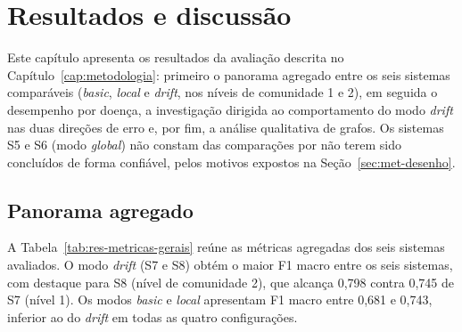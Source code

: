 \chapter{Resultados e discussão}\label{cap:resultados}

Este capítulo apresenta os resultados da avaliação descrita no Capítulo~\ref{cap:metodologia}: primeiro o panorama agregado entre os seis sistemas comparáveis (\textit{basic}, \textit{local} e \textit{drift}, nos níveis de comunidade 1 e 2), em seguida o desempenho por doença, a investigação dirigida ao comportamento do modo \textit{drift} nas duas direções de erro e, por fim, a análise qualitativa de grafos. Os sistemas S5 e S6 (modo \textit{global}) não constam das comparações por não terem sido concluídos de forma confiável, pelos motivos expostos na Seção~\ref{sec:met-desenho}.

\section{Panorama agregado}\label{sec:res-panorama}

A Tabela~\ref{tab:res-metricas-gerais} reúne as métricas agregadas dos seis sistemas avaliados. O modo \textit{drift} (S7 e S8) obtém o maior F1 macro entre os seis sistemas, com destaque para S8 (nível de comunidade 2), que alcança 0,798 contra 0,745 de S7 (nível 1). Os modos \textit{basic} e \textit{local} apresentam F1 macro entre 0,681 e 0,743, inferior ao do \textit{drift} em todas as quatro configurações.

